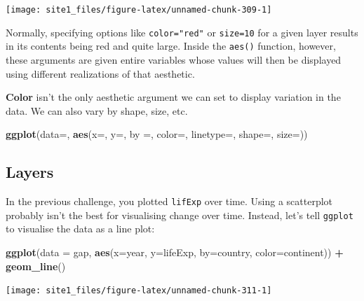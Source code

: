 \documentclass[]{book}
\newenvironment{Shaded}{\begin{snugshade}}{\end{snugshade}}
\newcommand{\KeywordTok}[1]{\textcolor[rgb]{0.13,0.29,0.53}{\textbf{#1}}}
\newcommand{\DataTypeTok}[1]{\textcolor[rgb]{0.13,0.29,0.53}{#1}}
\newcommand{\StringTok}[1]{\textcolor[rgb]{0.31,0.60,0.02}{#1}}
\newcommand{\OperatorTok}[1]{\textcolor[rgb]{0.81,0.36,0.00}{\textbf{#1}}}
\newcommand{\NormalTok}[1]{#1}
\begin{document}
\begin{center}\texttt{[image: site1\_files/figure-latex/unnamed-chunk-309-1]} \end{center}

Normally, specifying options like \texttt{color="red"} or
\texttt{size=10} for a given layer results in its contents being red and
quite large. Inside the \texttt{aes()} function, however, these
arguments are given entire variables whose values will then be displayed
using different realizations of that aesthetic.

\textbf{Color} isn't the only aesthetic argument we can set to display
variation in the data. We can also vary by shape, size, etc.

\begin{Shaded}
\begin{Highlighting}[]
\KeywordTok{ggplot}\NormalTok{(}\DataTypeTok{data=}\NormalTok{, }\KeywordTok{aes}\NormalTok{(}\DataTypeTok{x=}\NormalTok{, }\DataTypeTok{y=}\NormalTok{, }\DataTypeTok{by =}\NormalTok{, }\DataTypeTok{color=}\NormalTok{, }\DataTypeTok{linetype=}\NormalTok{, }\DataTypeTok{shape=}\NormalTok{, }\DataTypeTok{size=}\NormalTok{))}
\end{Highlighting}
\end{Shaded}

\subsection{Layers}\label{layers}

In the previous challenge, you plotted \texttt{lifExp} over time. Using
a scatterplot probably isn't the best for visualising change over time.
Instead, let's tell \texttt{ggplot} to visualise the data as a line
plot:

\begin{Shaded}
\begin{Highlighting}[]
\KeywordTok{ggplot}\NormalTok{(}\DataTypeTok{data =}\NormalTok{ gap, }\KeywordTok{aes}\NormalTok{(}\DataTypeTok{x=}\NormalTok{year, }\DataTypeTok{y=}\NormalTok{lifeExp, }\DataTypeTok{by=}\NormalTok{country, }\DataTypeTok{color=}\NormalTok{continent)) }\OperatorTok{+}\StringTok{ }
\StringTok{  }\KeywordTok{geom_line}\NormalTok{()}
\end{Highlighting}
\end{Shaded}

\begin{center}\texttt{[image: site1\_files/figure-latex/unnamed-chunk-311-1]} \end{center}
\end{document}
